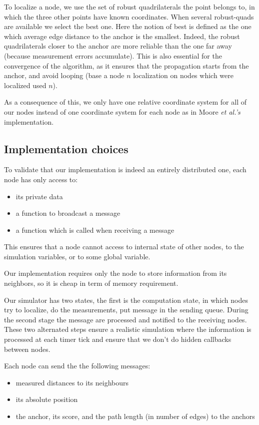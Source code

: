 \documentclass[letterpaper, 10 pt, conference]{ieeeconf}  %
\begin{document}
To localize a node, we use the set of robust quadrilaterals the point belongs to, in which the three other points have known coordinates. When several robust-quads are available we select the best one. Here the notion of best is defined as the one which average edge distance to the anchor is the smallest. Indeed, the robust quadrilaterals closer to the anchor are more reliable than the one far away (because measurement errors accumulate). This is also essential for the convergence of the algorithm, as it ensures that the propagation starts from the anchor, and avoid looping (base a node $n$ localization on nodes which were localized used $n$).

As a consequence of this, we only have one relative coordinate system for all of our nodes instead of one coordinate system for each node as in Moore \emph{et al.'s} implementation. 

\subsection{Implementation choices}

To validate that our implementation is indeed an entirely distributed one, each node has only access to:
\begin{itemize}
    \item its private data
    \item a function to broadcast a message
    \item a function which is called when receiving a message
\end{itemize}

This ensures that a node cannot access to internal state of other nodes, to the simulation variables, or to some global variable. 

Our implementation requires only the node to store information from its neighbors, so it is cheap in term of memory requirement.

Our simulator has two states, the first is the computation state, in which nodes try to localize, do the measurements, put message in the sending queue. During the second stage the message are processed and notified to the receiving nodes. These two alternated steps ensure a realistic simulation where the information is processed at each timer tick and ensure that we don't do hidden callbacks between nodes. 

Each node can send the the following messages:

\begin{itemize}
    \item measured distances to its neighbours
    \item its absolute position
    \item the anchor, its score, and the path length (in number of edges) to the anchors
\end{itemize}
\end{document}
